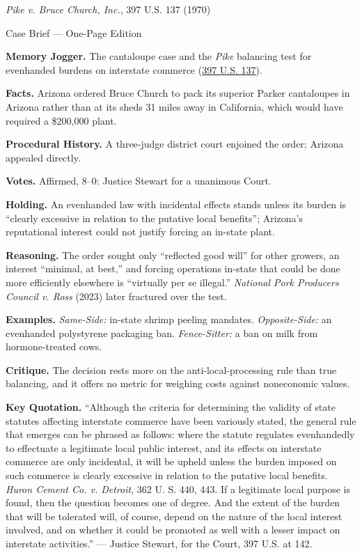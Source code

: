 \documentclass[12pt]{article}
\begin{document}
\begin{center}
{\Large \textit{Pike v. Bruce Church, Inc.}, 397 U.S. 137 (1970)\par}
\vspace{0.3em}
{\normalsize Case Brief --- One-Page Edition\par}
\end{center}

\textbf{Memory Jogger.} The cantaloupe case and the \textit{Pike} balancing test for evenhanded burdens on interstate commerce (\href{https://supreme.justia.com/cases/federal/us/397/137/}{397 U.S. 137}).

\textbf{Facts.} Arizona ordered Bruce Church to pack its superior Parker cantaloupes in Arizona rather than at its sheds 31 miles away in California, which would have required a \$200,000 plant.

\textbf{Procedural History.} A three-judge district court enjoined the order; Arizona appealed directly.

\textbf{Votes.} Affirmed, 8--0: Justice Stewart for a unanimous Court.

\textbf{Holding.} An evenhanded law with incidental effects stands unless its burden is ``clearly excessive in relation to the putative local benefits''; Arizona's reputational interest could not justify forcing an in-state plant.

\textbf{Reasoning.} The order sought only ``reflected good will'' for other growers, an interest ``minimal, at best,'' and forcing operations in-state that could be done more efficiently elsewhere is ``virtually per se illegal.'' \textit{National Pork Producers Council v. Ross} (2023) later fractured over the test.

\textbf{Examples.} \emph{Same-Side:} in-state shrimp peeling mandates. \emph{Opposite-Side:} an evenhanded polystyrene packaging ban. \emph{Fence-Sitter:} a ban on milk from hormone-treated cows.

\textbf{Critique.} The decision rests more on the anti-local-processing rule than true balancing, and it offers no metric for weighing costs against noneconomic values.

\textbf{Key Quotation.} ``Although the criteria for determining the validity of state statutes affecting interstate commerce have been variously stated, the general rule that emerges can be phrased as follows: where the statute regulates evenhandedly to effectuate a legitimate local public interest, and its effects on interstate commerce are only incidental, it will be upheld unless the burden imposed on such commerce is clearly excessive in relation to the putative local benefits. \textit{Huron Cement Co. v. Detroit}, 362 U. S. 440, 443. If a legitimate local purpose is found, then the question becomes one of degree. And the extent of the burden that will be tolerated will, of course, depend on the nature of the local interest involved, and on whether it could be promoted as well with a lesser impact on interstate activities.'' --- Justice Stewart, for the Court, 397 U.S. at 142.
\end{document}
